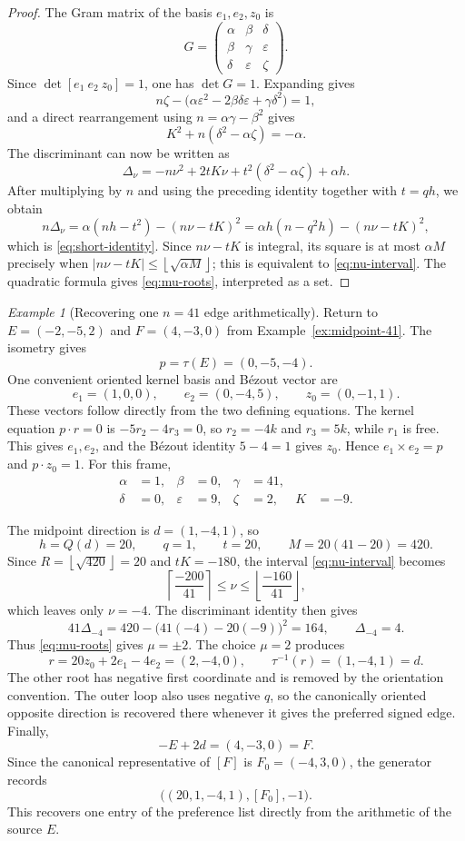 \documentclass[11pt]{amsart}
\theoremstyle{definition}
\theoremstyle{remark}
\newtheorem{example}[theorem]{Example}
\newcommand{\ceil}[1]{\left\lceil #1\right\rceil}
\newcommand{\floor}[1]{\left\lfloor #1\right\rfloor}
\begin{document}
\begin{proof}
The Gram matrix of the basis $e_1,e_2,z_0$ is
\[
 G=\begin{pmatrix}
 \alpha&\beta&\delta\\
 \beta&\gamma&\varepsilon\\
 \delta&\varepsilon&\zeta
 \end{pmatrix}.
\]
Since $\det[e_1\ e_2\ z_0]=1$, one has $\det G=1$.  Expanding gives
\[
 n\zeta-\bigl(\alpha\varepsilon^2-2\beta\delta\varepsilon
 +\gamma\delta^2\bigr)=1,
\]
and a direct rearrangement using $n=\alpha\gamma-\beta^2$ gives
\[
 K^2+n(\delta^2-\alpha\zeta)=-\alpha.
\]
The discriminant can now be written as
\[
 \Delta_\nu=-n\nu^2+2tK\nu+t^2(\delta^2-\alpha\zeta)+\alpha h.
\]
After multiplying by $n$ and using the preceding identity together with
$t=qh$, we obtain
\[
 n\Delta_\nu
 =\alpha(nh-t^2)-(n\nu-tK)^2
 =\alpha h(n-q^2h)-(n\nu-tK)^2,
\]
which is \eqref{eq:short-identity}.  Since $n\nu-tK$ is integral, its
square is at most $\alpha M$ precisely when
$|n\nu-tK|\le\floor{\sqrt{\alpha M}}$; this is equivalent to
\eqref{eq:nu-interval}.  The quadratic formula gives
\eqref{eq:mu-roots}, interpreted as a set.
\end{proof}

\begin{example}[Recovering one $n=41$ edge arithmetically]
\label{ex:lattice-41}
Return to $E=(-2,-5,2)$ and $F=(4,-3,0)$ from
Example~\ref{ex:midpoint-41}.  The isometry gives
\[
 p=\tau(E)=(0,-5,-4).
\]
One convenient oriented kernel basis and B\'ezout vector are
\[
 e_1=(1,0,0),
 \qquad
 e_2=(0,-4,5),
 \qquad
 z_0=(0,-1,1).
\]
These vectors follow directly from the two defining equations.  The kernel
equation $p\cdot r=0$ is $-5r_2-4r_3=0$, so $r_2=-4k$ and $r_3=5k$, while
$r_1$ is free.  This gives $e_1,e_2$, and the B\'ezout identity $5-4=1$
gives $z_0$.  Hence
$e_1\times e_2=p$ and $p\cdot z_0=1$.  For this frame,
\[
 \begin{aligned}
  \alpha&=1,& \beta&=0,& \gamma&=41,\\
  \delta&=0,& \varepsilon&=9,& \zeta&=2,& K&=-9.
 \end{aligned}
\]

The midpoint direction is $d=(1,-4,1)$, so
\[
 h=Q(d)=20,\qquad q=1,\qquad t=20,\qquad M=20(41-20)=420.
\]
Since $R=\floor{\sqrt{420}}=20$ and $tK=-180$, the interval
\eqref{eq:nu-interval} becomes
\[
 \ceil{\frac{-200}{41}}\le \nu\le
 \floor{\frac{-160}{41}},
\]
which leaves only $\nu=-4$.  The discriminant identity then gives
\[
 41\Delta_{-4}=420-\bigl(41(-4)-20(-9)\bigr)^2=164,
 \qquad \Delta_{-4}=4.
\]
Thus \eqref{eq:mu-roots} gives $\mu=\pm2$.  The choice $\mu=2$ produces
\[
 r=20z_0+2e_1-4e_2=(2,-4,0),
 \qquad
 \tau^{-1}(r)=(1,-4,1)=d.
\]
The other root has negative first coordinate and is removed by the orientation
convention.  The outer loop also uses negative $q$, so the canonically oriented
opposite direction is recovered there whenever it gives the preferred signed
edge.  Finally,
\[
 -E+2d=(4,-3,0)=F.
\]
Since the canonical representative of $[F]$ is $F_0=(-4,3,0)$, the generator
records
\[
 \bigl((20,1,-4,1),[F_0],-1\bigr).
\]
This recovers one entry of the preference list directly from the arithmetic
of the source $E$.
\end{example}
\end{document}
